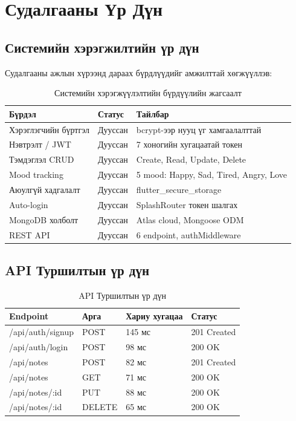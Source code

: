 \chapter{Судалгааны Үр Дүн}
\label{ch:results}

\section{Системийн хэрэгжилтийн үр дүн}

Судалгааны ажлын хүрээнд дараах бүрдлүүдийг амжилттай хөгжүүллэв:

\begin{longtable}{|p{5cm}|p{3cm}|p{6cm}|}
\caption{Системийн хэрэгжүүлэлтийн бүрдүүлийн жагсаалт}\\
\hline
\textbf{Бүрдэл} & \textbf{Статус} & \textbf{Тайлбар} \\
\hline
Хэрэглэгчийн бүртгэл & Дууссан & bcrypt-ээр нууц үг хамгаалалттай \\
\hline
Нэвтрэлт / JWT & Дууссан & 7 хоногийн хугацаатай токен \\
\hline
Тэмдэглэл CRUD & Дууссан & Create, Read, Update, Delete \\
\hline
Mood tracking & Дууссан & 5 mood: Happy, Sad, Tired, Angry, Love \\
\hline
Аюулгүй хадгалалт & Дууссан & flutter\_secure\_storage \\
\hline
Auto-login & Дууссан & SplashRouter токен шалгах \\
\hline
MongoDB холболт & Дууссан & Atlas cloud, Mongoose ODM \\
\hline
REST API & Дууссан & 6 endpoint, authMiddleware \\
\hline
\end{longtable}

\section{API Туршилтын үр дүн}

\begin{longtable}{|p{4cm}|p{2.5cm}|p{3cm}|p{4cm}|}
\caption{API Туршилтын үр дүн}\\
\hline
\textbf{Endpoint} & \textbf{Арга} & \textbf{Хариу хугацаа} & \textbf{Статус} \\
\hline
/api/auth/signup & POST & 145 мс & 201 Created \\
\hline
/api/auth/login & POST & 98 мс & 200 OK \\
\hline
/api/notes & POST & 82 мс & 201 Created \\
\hline
/api/notes & GET & 71 мс & 200 OK \\
\hline
/api/notes/:id & PUT & 88 мс & 200 OK \\
\hline
/api/notes/:id & DELETE & 65 мс & 200 OK \\
\hline
\end{longtable}

